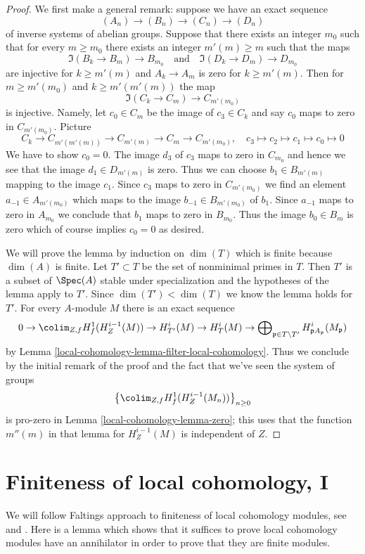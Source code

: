 \begin{proof}
We first make a general remark: suppose we have an exact
sequence
$$
(A_n) \to (B_n) \to (C_n) \to (D_n)
$$
of inverse systems of abelian groups. Suppose that there exists
an integer $m_0$ such that for every $m \geq m_0$
there exists an integer $m'(m) \geq m$ such that the maps
$$
\Im(B_k \to B_m) \longrightarrow B_{m_0}
\quad\text{and}\quad
\Im(D_k \to D_m) \longrightarrow D_{m_0}
$$
are injective for $k \geq m'(m)$ and $A_k \to A_m$ is zero
for $k \geq m'(m)$. Then for $m \geq m'(m_0)$ and $k \geq m'(m'(m))$
the map
$$
\Im(C_k \to C_m) \to C_{m'(m_0)}
$$
is injective. Namely, let $c_0 \in C_m$ be the image of $c_3 \in C_k$
and say $c_0$ maps to zero in $C_{m'(m_0)}$. Picture
$$
C_k \to C_{m'(m'(m))} \to C_{m'(m)} \to C_m \to C_{m'(m_0)},\quad
c_3 \mapsto c_2 \mapsto c_1 \mapsto c_0 \mapsto 0
$$
We have to show $c_0 = 0$.
The image $d_3$ of $c_3$ maps to zero in $C_{m_0}$ and hence
we see that the image $d_1 \in D_{m'(m)}$ is zero.
Thus we can choose $b_1 \in B_{m'(m)}$ mapping to
the image $c_1$. Since $c_3$ maps to zero in
$C_{m'(m_0)}$ we find an element $a_{-1} \in A_{m'(m_0)}$
which maps to the image $b_{-1} \in B_{m'(m_0)}$ of $b_1$.
Since $a_{-1}$ maps to zero in $A_{m_0}$ we conclude that
$b_1$ maps to zero in $B_{m_0}$. Thus the image $b_0 \in B_m$
is zero which of course implies $c_0 = 0$ as desired.

\medskip\noindent
We will prove the lemma by induction on $\dim(T)$ which is
finite because $\dim(A)$ is finite. Let $T' \subset T$ be
the set of nonminimal primes in $T$. Then $T'$ is a subset
of $\Spec(A)$ stable under specialization and the hypotheses
of the lemma apply to $T'$. Since $\dim(T') < \dim(T)$ we know
the lemma holds for $T'$. For every $A$-module $M$ there is an
exact sequence
$$
0 \to \colim_{Z, f} H^1_f(H^{i - 1}_Z(M)) \to
H^i_{T'}(M) \to H^i_T(M) \to
\bigoplus\nolimits_{\mathfrak p \in T \setminus T'}
H^i_{\mathfrak p A_\mathfrak p}(M_\mathfrak p)
$$
by Lemma \ref{local-cohomology-lemma-filter-local-cohomology}.
Thus we conclude by the initial remark of the proof
and the fact that we've seen the system of groups
$$
\left\{\colim_{Z, f} H^1_f(H^{i - 1}_Z(M_n))\right\}_{n \geq 0}
$$
is pro-zero in Lemma \ref{local-cohomology-lemma-zero}; this uses that the function
$m''(m)$ in that lemma for $H^{i - 1}_Z(M)$ is independent of $Z$.
\end{proof}

\section{Finiteness of local cohomology, I}
\label{local-cohomology-section-finiteness}
We will follow Faltings approach to finiteness of local cohomology
modules, see \cite{Faltings-annulators} and \cite{Faltings-finiteness}.
Here is a lemma which shows that it suffices to prove
local cohomology modules have an annihilator in order to prove that
they are finite modules.

